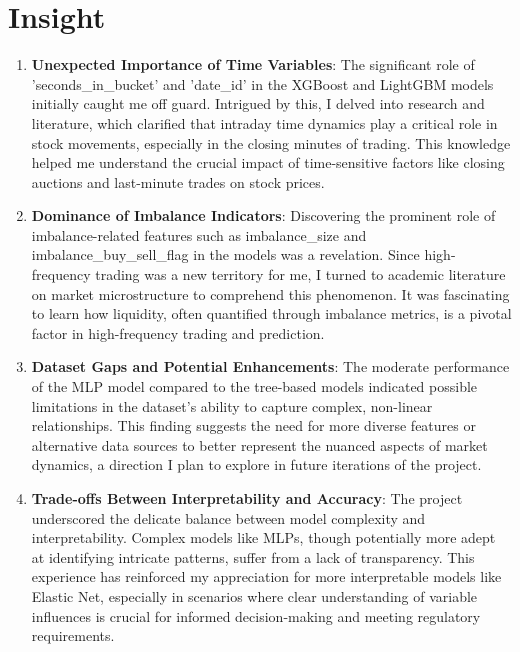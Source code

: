 \documentclass[12pt]{article}
\newtheorem{Proof of Lemma}{Proof of Lemma}
\begin{document}
\section{Insight}
\begin{enumerate}
  \item \textbf{Unexpected Importance of Time Variables}: The significant role of 'seconds\_in\_bucket' and 'date\_id' in the XGBoost and LightGBM models initially caught me off guard. Intrigued by this, I delved into research and literature\citep{selccuk2006intraday}, which clarified that intraday time dynamics play a critical role in stock movements, especially in the closing minutes of trading. This knowledge helped me understand the crucial impact of time-sensitive factors like closing auctions and last-minute trades on stock prices.

  \item \textbf{Dominance of Imbalance Indicators}: Discovering the prominent role of imbalance-related features such as imbalance\_size and imbalance\_buy\_sell\_flag in the models was a revelation. Since high-frequency trading was a new territory for me, I turned to academic literature on market microstructure\citep{o1998market}\citep{o2015high} to comprehend this phenomenon. It was fascinating to learn how liquidity, often quantified through imbalance metrics, is a pivotal factor in high-frequency trading and prediction.
  
  \item \textbf{Dataset Gaps and Potential Enhancements}: The moderate performance of the MLP model compared to the tree-based models indicated possible limitations in the dataset's ability to capture complex, non-linear relationships. This finding suggests the need for more diverse features or alternative data sources to better represent the nuanced aspects of market dynamics, a direction I plan to explore in future iterations of the project.
  
  \item \textbf{Trade-offs Between Interpretability and Accuracy}: The project underscored the delicate balance between model complexity and interpretability. Complex models like MLPs, though potentially more adept at identifying intricate patterns, suffer from a lack of transparency. This experience has reinforced my appreciation for more interpretable models like Elastic Net, especially in scenarios where clear understanding of variable influences is crucial for informed decision-making and meeting regulatory requirements.
\end{enumerate}
\end{document}
